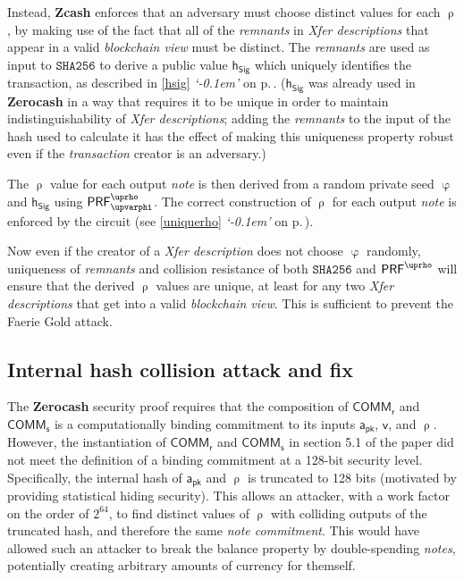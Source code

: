 \documentclass{article}
\newcommand{\crossref}[1]{\autoref{#1} \emph{`\nameref*{#1}\kern -0.1em'} on p.\,\pageref*{#1}}
\newcommand{\term}[1]{\textsl{#1}\xspace}
\newcommand{\termbf}[1]{\textbf{#1}\xspace}
\newcommand{\Zcash}{\termbf{Zcash}}
\newcommand{\Zerocash}{\termbf{Zerocash}}
\newcommand{\coin}{\term{note}}
\newcommand{\coins}{\term{notes}}
\newcommand{\coinCommitment}{\term{note commitment}}
\newcommand{\pourDescription}{\term{Xfer description}}
\newcommand{\pourDescriptions}{\term{Xfer descriptions}}
\newcommand{\transaction}{\term{transaction}}
\newcommand{\blockchainview}{\term{blockchain view}}
\newcommand{\serialNumbers}{\term{remnants}}
\newcommand{\FullHash}{\mathtt{SHA256}}
\newcommand{\AuthPublic}{\mathsf{a_{pk}}}
\newcommand{\Value}{\mathsf{v}}
\newcommand{\CoinCommitRand}{\mathsf{r}}
\newcommand{\CoinAddressRand}{\mathsf{\uprho}}
\newcommand{\CoinAddressPreRand}{\mathsf{\upvarphi}}
\newcommand{\CoinCommitS}{\mathsf{s}}
\newcommand{\PRF}[2]{\mathsf{{PRF}^{#2}_\mathnormal{#1}}}
\newcommand{\PRFrho}[1]{\PRF{#1}{\CoinAddressRand}}
\newcommand{\hSig}{\mathsf{h_{Sig}}}
\newcommand{\COMM}[1]{\mathsf{COMM}_{#1}}
\begin{document}
Instead, \Zcash enforces that an adversary must choose distinct values
for each $\CoinAddressRand$, by making use of the fact that all of the
\serialNumbers in \pourDescriptions that appear in a valid \blockchainview
must be distinct. The \serialNumbers are used as input to $\FullHash$
to derive a public value $\hSig$ which uniquely identifies the transaction,
as described in \crossref{hsig}. ($\hSig$ was already used in \Zerocash
in a way that requires it to be unique in order to maintain
indistinguishability of \pourDescriptions; adding the \serialNumbers
to the input of the hash used to calculate it has the effect of making
this uniqueness property robust even if the \transaction creator is an
adversary.)

The $\CoinAddressRand$ value for each output \coin is then derived from
a random private seed $\CoinAddressPreRand$ and $\hSig$ using
$\PRFrho{\CoinAddressPreRand}$. The correct construction of
$\CoinAddressRand$ for each output \coin is enforced by the circuit
(see \crossref{uniquerho}).

Now even if the creator of a \pourDescription does not choose
$\CoinAddressPreRand$ randomly, uniqueness of \serialNumbers and
collision resistance of both $\FullHash$ and $\PRFrho{}$ will ensure
that the derived $\CoinAddressRand$ values are unique, at least for
any two \pourDescriptions that get into a valid \blockchainview.
This is sufficient to prevent the Faerie Gold attack.


\subsection{Internal hash collision attack and fix}

The \Zerocash security proof requires that the composition of
$\COMM{\CoinCommitRand}$ and $\COMM{\CoinCommitS}$ is a computationally
binding commitment to its inputs $\AuthPublic$, $\Value$, and
$\CoinAddressRand$. However, the instantiation of $\COMM{\CoinCommitRand}$
and $\COMM{\CoinCommitS}$ in section 5.1 of the paper did not meet
the definition of a binding commitment at a 128-bit security level.
Specifically, the internal hash of $\AuthPublic$ and $\CoinAddressRand$
is truncated to 128 bits (motivated by providing statistical hiding
security). This allows an attacker, with a work factor on the order of
$2^{64}$, to find distinct values of $\CoinAddressRand$ with colliding
outputs of the truncated hash, and therefore the same \coinCommitment.
This would have allowed such an attacker to break the balance property
by double-spending \coins, potentially creating arbitrary amounts of
currency for themself.
\end{document}
